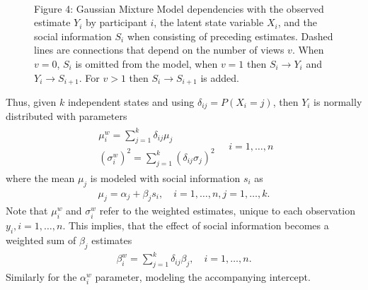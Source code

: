 \documentclass[9pt,a4paper,twocolumn,lineno]{article}
\begin{document}
\begin{figure}[!h]
\centering
{}
	\\
	\justify \tiny Figure 4: Gaussian Mixture Model dependencies with the observed estimate $Y_i$ by participant $i$, the latent state variable $X_i$, and the social information $S_i$ when consisting of preceding estimates. Dashed lines are connections that depend on the number of views $v$. When $v=0$, $S_i$ is omitted from the model, when $v=1$ then $S_i\to Y_i$ and $Y_i\to S_{i+1}$. For $v>1$ then $S_i\to S_{i+1}$ is added.%
\label{fig:model}
\end{figure}

Thus, given $k$ independent states and using $\delta_{ij} = P(X_i=j)$, then $Y_i$ is normally distributed with parameters
\begin{align}
\begin{array}{l}
	\mu^w_i = \sum_{j=1}^k \delta_{ij} \mu_j \\
	(\sigma^w_i)^2 = \sum_{j=1}^k \left(\delta_{ij} \sigma_j\right)^2
\end{array}
\quad i=1,\dots,n \label{eq: weighted Gaussian parameters}
\end{align}
where the mean $\mu_j$ is modeled with social information $s_i$ as
\begin{align}
	\mu_j = \alpha_j+\beta_j s_i, \quad i=1,\dots,n, j=1,\dots,k.
\end{align}
Note that $\mu^w_i$ and $\sigma^w_i$ refer to the weighted estimates, unique to each observation $y_i, i=1, \dots, n$. This implies, that the effect of social information becomes a weighted sum of $\beta_j$ estimates
\begin{align}
	\beta^w_i = \sum_{j=1}^k \delta_{ij} \beta_{j}, \quad i=1,\dots, n. \label{eq: weighted beta}
\end{align}
Similarly for the $\alpha_i^w$ parameter, modeling the accompanying intercept.
\end{document}
